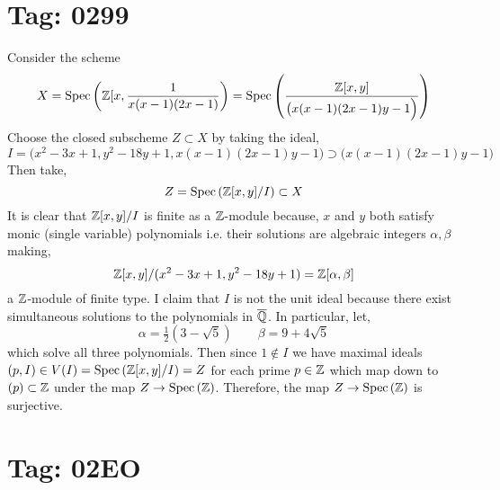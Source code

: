 \documentclass[12pt]{article}
\begin{document}
\section{Tag: 0299}

Consider the scheme 
\[ X = \mathrm{Spec}\left( \mathbb{Z}[x, \frac{1}{x(x-1)(2x - 1)} \right) = \mathrm{Spec}\left( \frac{\mathbb{Z}[x,y]}{\big( x(x - 1)(2x - 1)y - 1 \Big)} \right) \]
Choose the closed subscheme $Z \subset X$ by taking the ideal,
\[ I = \Big( x^2 - 3x + 1, y^2 - 18 y + 1,  x(x - 1)(2x - 1)y - 1 \Big) \supset \big( x(x - 1)(2x - 1)y - 1 \Big) \]
Then take,
\[ Z = \mathrm{Spec}\left( \mathbb{Z}[x,y]/I \right) \subset X \]
It is clear that $\mathbb{Z}[x,y]/I$ is finite as a $\mathbb{Z}$-module because, $x$ and $y$ both satisfy monic (single variable) polynomials i.e. their solutions are algebraic integers $\alpha, \beta$ making,
\[ \mathbb{Z}[x,y]/(x^2 - 3x + 1, y^2 - 18 y + 1) = \mathbb{Z}[\alpha, \beta] \]
a $\mathbb{Z}$-module of finite type. I claim that $I$ is not the unit ideal because there exist simultaneous solutions to the polynomials in $\overline{\mathbb{Q}}$. In particular, let,
\[ \alpha = \tfrac{1}{2} (3 - \sqrt{5}) \quad \quad \beta = 9 + 4 \sqrt{5} \]
which solve all three polynomials. Then since $1 \notin I$ we have maximal ideals $(p, I) \in V(I) = \mathrm{Spec}\left( \mathbb{Z}[x,y]/I \right) = Z$ for each prime $p \in \mathbb{Z}$ which map down to $(p) \subset \mathbb{Z}$ under the map $Z \to \mathrm{Spec}\left( \mathbb{Z} \right)$. Therefore, the map $Z \to \mathrm{Spec}\left( \mathbb{Z} \right)$ is surjective. 



\section{Tag: 02EO}
\end{document}

